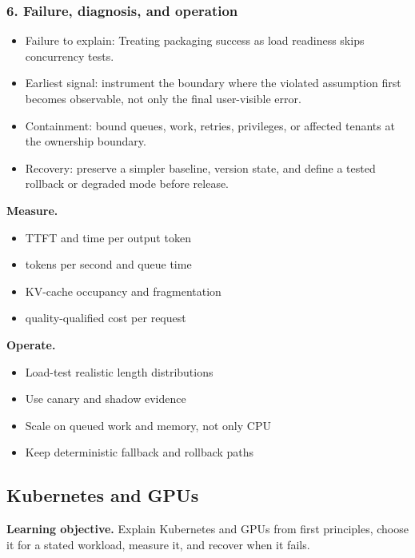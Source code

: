 \subsubsection*{6. Failure, diagnosis, and operation}
\begin{itemize}
\item Failure to explain: Treating packaging success as load readiness skips concurrency tests.
\item Earliest signal: instrument the boundary where the violated assumption first becomes observable, not only the final user-visible error.
\item Containment: bound queues, work, retries, privileges, or affected tenants at the ownership boundary.
\item Recovery: preserve a simpler baseline, version state, and define a tested rollback or degraded mode before release.
\end{itemize}
\textbf{Measure.}\begin{itemize}
\item TTFT and time per output token
\item tokens per second and queue time
\item KV-cache occupancy and fragmentation
\item quality-qualified cost per request
\end{itemize}
\textbf{Operate.}\begin{itemize}
\item Load-test realistic length distributions
\item Use canary and shadow evidence
\item Scale on queued work and memory, not only CPU
\item Keep deterministic fallback and rollback paths
\end{itemize}
\subsection{Kubernetes and GPUs}
\textbf{Learning objective.} Explain Kubernetes and GPUs from first principles, choose it for a stated workload, measure it, and recover when it fails.
